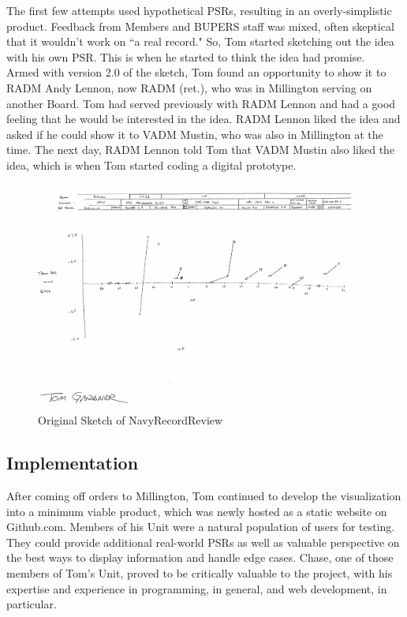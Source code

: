 \documentclass[UTF8]{article}
\begin{document}
The first few attempts used hypothetical PSRs, resulting in an overly-simplistic
product. Feedback from Members and BUPERS staff was mixed, often skeptical that
it wouldn't work on ``a real record." So, Tom started sketching out the idea with
his own PSR. This is when he started to think the idea had promise.  \\

Armed with version 2.0 of the sketch, Tom found an opportunity to 
show it to RADM Andy Lennon, now RADM (ret.), who was in Millington serving on 
another Board. Tom had served previously with RADM Lennon and had a good feeling
that he would be interested in the idea. RADM Lennon liked the idea and asked if
he could show it to VADM Mustin, who was also in Millington at the time. The 
next day, RADM Lennon told Tom that VADM Mustin also liked the idea, which is
when Tom started coding a digital prototype.  \\ 


\begin{figure}[h!]
 \centering
 \includegraphics[width=0.95\textwidth]{original_sketch.png}
 \caption{Original Sketch of NavyRecordReview}
\end{figure}


\subsection{Implementation}

After coming off orders to Millington, Tom continued to develop the visualization
into a minimum viable product, which was newly hosted as a static website on
Github.com. Members of his Unit were a natural population of users for testing.
They could provide additional real-world PSRs as well as valuable perspective on 
the best ways to display information and handle edge cases. Chase, one of those
members of Tom's Unit, proved to be critically valuable to the project, with his
expertise and experience in programming, in general, and web development, in 
particular. \\
\end{document}

